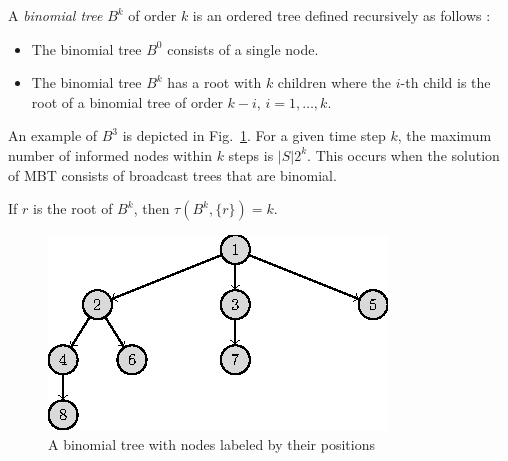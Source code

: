A \emph{binomial tree} $B^k$ of order $k$ is an ordered tree defined recursively as follows \cite{cormen01}:
\begin{itemize}
\item The binomial tree $B^0$ consists of a single node.
\item The binomial tree $B^k$ has a root with $k$ children where the $i$-th child is the root of a binomial tree of order $k-i$, $i=1,\dots,k$.
\end{itemize}
An example of $B^3$ is depicted in Fig.~\ref{fig:beta}.
For a given time step $k$, the maximum number of informed nodes within $k$ steps is $|S|2^k$.
This occurs when the solution of MBT consists of broadcast trees that are binomial.
\begin{observation}
\label{obs:btspread}
If $r$ is the root of $B^k$, then $\tau(B^k,\{r\})=k$.
\end{observation}
\begin{figure}
\centering
	\includegraphics{figurer/btindex.eps}
\caption{A binomial tree with nodes labeled by their positions}
\label{fig:beta}
\end{figure}

